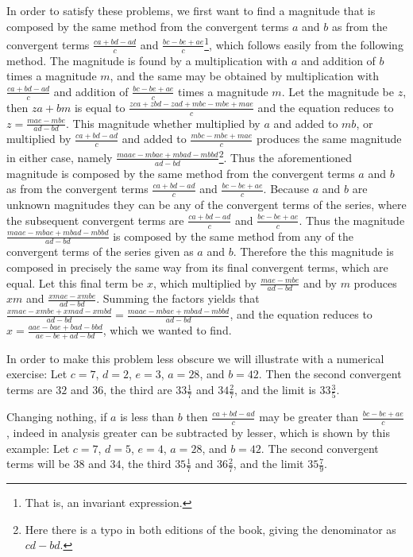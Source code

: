\documentclass[11pt,letterpaper]{book}
\begin{document}
In order to satisfy these problems, we first want to find a
magnitude that is composed by the same method from the convergent terms $a$ and
$b$ as from the convergent terms $\frac{ca+bd-ad}{c}$ and
$\frac{bc-be+ae}{c}$\footnote{That is, an invariant expression.}, which follows
easily from the following method.
The magnitude is found by a multiplication with $a$ and addition of $b$
times a magnitude $m$, and the same may be obtained by multiplication with
$\frac{ca+bd-ad}{c}$ and addition of $\frac{bc-be+ae}{c}$ times a magnitude $m$.
Let the magnitude be $z$, then $za+bm$ is equal to $\frac{zca + zbd - zad + mbc
- mbe + mae}{c}$ and the equation reduces to $z = \frac{mae - mbe}{ad - bd}$.
This magnitude whether multiplied by $a$ and added to $mb$, or multiplied by
$\frac{ca+bd-ad}{c}$ and added to $\frac{mbc-mbe+mae}{c}$ produces the same
magnitude in either case, namely $\frac{maae - mbae + mbad - mbbd}{ad -
bd}$\footnote{Here there is a typo in both editions of the book, giving the
denominator as $cd-bd$.}.
Thus the aforementioned magnitude is composed by the same method from the
convergent terms $a$ and $b$ as from the convergent terms $\frac{ca+bd-ad}{c}$
and $\frac{bc-be+ae}{c}$. Because $a$ and $b$ are unknown magnitudes they
can be any of the convergent terms of the series, where the subsequent
convergent terms are $\frac{ca+bd-ad}{c}$ and $\frac{bc-be+ae}{c}$.
Thus the magnitude $\frac{maae - mbae + mbad - mbbd}{ad - bd}$ is 
composed by the same method from any of the
convergent terms of the series given as $a$ and $b$. 
Therefore the this magnitude is composed in precisely the same way from its
final convergent terms, which are equal. 
Let this final term be $x$, which multiplied by $\frac{mae - mbe}{ad - bd}$ 
and by $m$ produces $xm$ and
$\frac{xmae - xmbe}{ad - bd}$. 
Summing the factors yields that $\frac{xmae - xmbe + xmad - xmbd}{ad - bd} 
= \frac{maae - mbae + mbad - mbbd}{ad - bd}$, and the equation
reduces to $x = \frac{aae - bae + bad - bbd}{ae - be + ad
- bd}$, which we wanted to find.

In order to make this problem less obscure we will illustrate with a numerical
exercise:
Let $c = 7$, $d = 2$, $e = 3$, $a = 28$, and $b = 42$. Then the second
convergent terms are $32$ and $36$, the third are $33\frac{1}{7}$ and
$34\frac{2}{7}$, and the limit is $33\frac{3}{5}$.

Changing nothing, if $a$ is less than $b$ then $\frac{ca+bd-ad}{c}$ may be
greater than $\frac{bc-be+ae}{c}$, indeed in analysis greater can be subtracted
by lesser, which is shown by this example: Let $c = 7$, $d
= 5$, $e = 4$, $a = 28$, and $b = 42$. The second convergent terms will be $38$
and $34$, the third $35\frac{1}{7}$ and $36\frac{2}{7}$, and the limit
$35\frac{7}{9}$.
\end{document}
